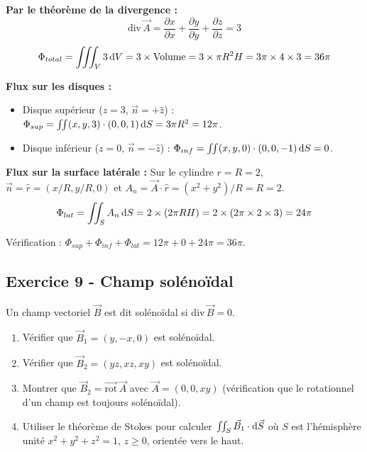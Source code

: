 \documentclass[12pt,a4paper]{article}
\begin{document}
\begin{boitecorrige}
\textbf{Par le théorème de la divergence :}
\[
\text{div}\,\vec{A} = \frac{\partial x}{\partial x}+\frac{\partial y}{\partial y}+\frac{\partial z}{\partial z} = 3
\]
\[
\Phi_{total} = \iiint_V 3\,\mathrm{d} V = 3\times\text{Volume} = 3\times\pi R^2 H = 3\pi\times4\times3 = 36\pi
\]

\textbf{Flux sur les disques :}
\begin{itemize}[nosep]
  \item Disque supérieur ($z=3$, $\vec{n}=+\hat{z}$) : $\Phi_{sup} = \iint(x,y,3)\cdot(0,0,1)\,\mathrm{d} S = 3\pi R^2 = 12\pi$.
  \item Disque inférieur ($z=0$, $\vec{n}=-\hat{z}$) : $\Phi_{inf} = \iint(x,y,0)\cdot(0,0,-1)\,\mathrm{d} S = 0$.
\end{itemize}

\textbf{Flux sur la surface latérale :}
Sur le cylindre $r=R=2$, $\vec{n} = \hat{r} = (x/R, y/R, 0)$ et $A_n = \vec{A}\cdot\hat{r} = (x^2+y^2)/R = R = 2$.
\[
\Phi_{lat} = \iint_S A_n\,\mathrm{d} S = 2\times(2\pi R H) = 2\times(2\pi\times2\times3) = 24\pi
\]

Vérification : $\Phi_{sup}+\Phi_{inf}+\Phi_{lat} = 12\pi+0+24\pi = 36\pi$.
\end{boitecorrige}

\subsection*{Exercice 9 - Champ solénoïdal \niveau{\moyen}}

\begin{boiteexercice}
Un champ vectoriel $\vec{B}$ est dit solénoïdal si $\text{div}\,\vec{B} = 0$.
\begin{enumerate}
  \item Vérifier que $\vec{B}_1 = (y, -x, 0)$ est solénoïdal.
  \item Vérifier que $\vec{B}_2 = (yz, xz, xy)$ est solénoïdal.
  \item Montrer que $\vec{B}_2 = \overrightarrow{\text{rot}}\,\vec{A}$ avec $\vec{A} = (0, 0, xy)$ (vérification que le rotationnel d'un champ est toujours solénoïdal).
  \item Utiliser le théorème de Stokes pour calculer $\iint_S \vec{B}_1\cdot\mathrm{d}\vec{S}$ où $S$ est l'hémisphère unité $x^2+y^2+z^2=1$, $z\geq0$, orientée vers le haut.
\end{enumerate}
\end{boiteexercice}
\end{document}
